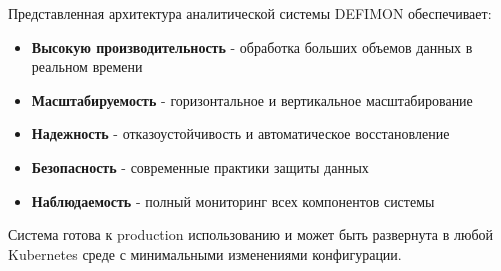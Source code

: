 \documentclass[11pt,a4paper]{article}
\begin{document}
Представленная архитектура аналитической системы DEFIMON обеспечивает:

\begin{itemize}
    \item \textbf{Высокую производительность} - обработка больших объемов данных в реальном времени
    \item \textbf{Масштабируемость} - горизонтальное и вертикальное масштабирование
    \item \textbf{Надежность} - отказоустойчивость и автоматическое восстановление
    \item \textbf{Безопасность} - современные практики защиты данных
    \item \textbf{Наблюдаемость} - полный мониторинг всех компонентов системы
\end{itemize}

Система готова к production использованию и может быть развернута в любой Kubernetes среде с минимальными изменениями конфигурации.
\end{document}
